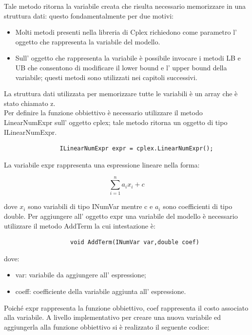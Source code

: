 \documentclass[11pt]{article}
\begin{document}
Tale metodo ritorna la variabile creata che risulta necessario memorizzare in una struttura dati: questo fondamentalmente per due motivi:

\begin{itemize}
\item Molti metodi presenti nella libreria di Cplex richiedono come parametro l' oggetto che rappresenta la variabile del modello.
\item  Sull' oggetto che rappresenta la variabile \`e possibile invocare i metodi LB e UB che consentono di modificare il lower bound e l' upper bound della variabile; questi metodi sono utilizzati nei capitoli successivi. 
\end{itemize}

La struttura dati utilizzata per memorizzare tutte le variabili \`e un array che \`e stato chiamato z.\\

Per definire la funzione obbiettivo \`e necessario utilizzare il metodo LinearNumExpr sull' oggetto cplex; tale metodo ritorna un oggetto di tipo ILinearNumExpr.


\begin{lstlisting}
                ILinearNumExpr expr = cplex.LinearNumExpr();
\end{lstlisting}


La variabile expr rappresenta una espressione lineare nella forma:

$$\displaystyle{\sum_{i = 1}^n a_i x_i + c} $$

dove $x_i$ sono variabili di tipo INumVar mentre c e $a_i$ sono coefficienti di tipo double. Per aggiungere all' oggetto expr una variabile del modello \`e necessario utilizzare il metodo AddTerm la cui intestazione \`e:

\begin{lstlisting}
                   void AddTerm(INumVar var,double coef)
\end{lstlisting}

dove:

\begin{itemize}
\item var: variabile da aggiungere all' espressione;
\item  coeff: coefficiente della variabile aggiunta all' espressione.
\end{itemize}

Poich\'e expr rappresenta la funzione obbiettivo, coef rappresenta il costo associato alla variabile.
A livello implementativo per creare una nuova variabile ed aggiungerla alla funzione obbiettivo si \`e realizzato il seguente codice:
\end{document}
